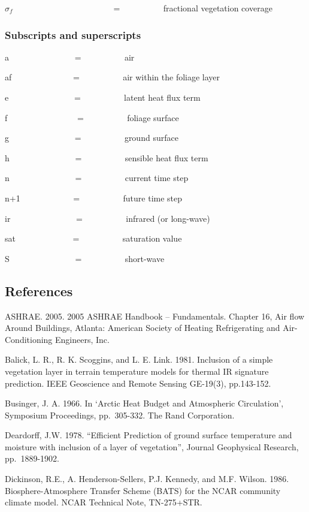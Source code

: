 \(\sigma\)\(_f\) ~~~~~~~~~~~ ~~~~~~~~~~~ = ~~~~~~~~~ fractional vegetation coverage

\subsubsection{Subscripts and superscripts}\label{subscripts-and-superscripts-000}

a~~~~~~~~~~~~~~~ = ~~~~~~~~~ air

af~~~~~~~~~~~~~~ = ~~~~~~~~~ air within the foliage layer

e~~~~~~~~~~~~~~~ = ~~~~~~~~~ latent heat flux term

f~~~~~~~~~~~~~~~~ = ~~~~~~~~~ foliage surface

g~~~~~~~~~~~~~~~ = ~~~~~~~~~ ground surface

h~~~~~~~~~~~~~~~ = ~~~~~~~~~ sensible heat flux term

n~~~~~~~~~~~~~~~ = ~~~~~~~~~ current time step

n+1~~~~~~~~~~~~ = ~~~~~~~~~ future time step

ir~~~~~~~~~~~~~~~ = ~~~~~~~~~ infrared (or long-wave)

sat~~~~~~~~~~~~~ = ~~~~~~~~~ saturation value

S~~~~~~~~~~~~~~~ = ~~~~~~~~~ short-wave

\subsection{References}\label{references-025}

ASHRAE. 2005. 2005 ASHRAE Handbook -- Fundamentals. Chapter 16, Air flow Around Buildings, Atlanta: American Society of Heating Refrigerating and Air-Conditioning Engineers, Inc.

Balick, L. R., R. K. Scoggins, and L. E. Link. 1981. Inclusion of a simple vegetation layer in terrain temperature models for thermal IR signature prediction. IEEE Geoscience and Remote Sensing GE-19(3), pp.143-152.

Businger, J. A. 1966. In `Arctic Heat Budget and Atmospheric Circulation', Symposium Proceedings, pp.~305-332. The Rand Corporation.

Deardorff, J.W. 1978. ``Efficient Prediction of ground surface temperature and moisture with inclusion of a layer of vegetation'', Journal Geophysical Research, pp.~1889-1902.

Dickinson, R.E., A. Henderson-Sellers, P.J. Kennedy, and M.F. Wilson. 1986. Biosphere-Atmosphere Transfer Scheme (BATS) for the NCAR community climate model. NCAR Technical Note, TN-275+STR.

